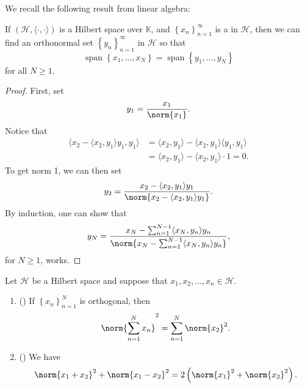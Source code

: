 \documentclass[notoc,notitlepage]{tufte-book}
\DeclareMathOperator{\Span}{span}
\begin{document}
We recall the following result from linear algebra:

\begin{thm}\label{thm:gram_schmidt_orthogonalisation_process}
  If $(\mathcal{H}, \langle \cdot, \cdot \rangle)$
  is a Hilbert space over $\mathbb{K}$,
  and $\left\{ x_n \right\}_{n=1}^{\infty}$ is a  in $\mathcal{H}$,
  then we can find an orthonormal set
  $\left\{ y_n \right\}_{n=1}^{\infty}$ in $\mathcal{H}$ so that
  \begin{equation*}
    \Span \left\{ x_1, \ldots, x_N \right\} = \Span \left\{ y_1, \ldots, y_N \right\}
  \end{equation*}
  for all $N \geq 1$.
\end{thm}

\begin{proof}
  First, set
  \begin{equation*}
    y_1 = \frac{x_1}{\norm{x_1}}.
  \end{equation*}
  Notice that
  \begin{align*}
    \langle x_2 - \langle x_2, y_1 \rangle y_1, y_1 \rangle
    &= \langle x_2, y_1 \rangle - \langle x_2, y_1 \rangle \langle y_1, y_1 \rangle \\
    &= \langle x_2, y_1 \rangle - \langle x_2, y_1 \rangle \cdot 1 = 0.
  \end{align*}
  To get norm 1, we can then set
  \begin{equation*}
    y_2 = \frac{x_2 - \langle x_2, y_1 \rangle y_1}{\norm{x_2 - \langle x_2, y_1
    \rangle y_1}}.
  \end{equation*}
  By induction, one can show that
  \begin{equation*}
    y_N = \frac{x_N - \sum_{n=1}^{N-1} \langle x_N, y_n \rangle y_n}{\norm{x_N -
    \sum_{n=1}^{N-1} \langle x_N, y_n \rangle y_n}},
  \end{equation*}
  for $N \geq 1$, works.
\end{proof}

\begin{thm}\label{thm:the_pythagorean_theorem_and_parallelogram_law}
  Let $\mathcal{H}$ be a Hilbert space
  and suppose that $x_1, x_2, \ldots, x_n \in \mathcal{H}$.
  \begin{enumerate}
    \item ()
      If $\left\{ x_n \right\}_{n=1}^N$ is orthogonal, then
      \begin{equation*}
        \norm{ \sum_{n=1}^{N} x_n }^2 = \sum_{n=1}^{N} \norm{x_2}^2.
      \end{equation*}
    \item ()
      We have
      \begin{equation*}
        \norm{x_1 + x_2}^2 + \norm{x_1 - x_2}^2 = 2 \left( \norm{x_1}^2 +
        \norm{x_2}^2 \right).
      \end{equation*}
  \end{enumerate}
\end{thm}
\end{document}
